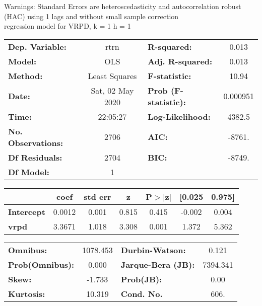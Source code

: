 Warnings: \newline
 [1] Standard Errors are heteroscedasticity and autocorrelation robust (HAC) using 1 lags and without small sample correction\\ 

regression model for VRPD, k = 1 h = 1\begin{center}
\begin{tabular}{lclc}
\toprule
\textbf{Dep. Variable:}    &       rtrn       & \textbf{  R-squared:         } &     0.013   \\
\textbf{Model:}            &       OLS        & \textbf{  Adj. R-squared:    } &     0.013   \\
\textbf{Method:}           &  Least Squares   & \textbf{  F-statistic:       } &     10.94   \\
\textbf{Date:}             & Sat, 02 May 2020 & \textbf{  Prob (F-statistic):} &  0.000951   \\
\textbf{Time:}             &     22:05:27     & \textbf{  Log-Likelihood:    } &    4382.5   \\
\textbf{No. Observations:} &        2706      & \textbf{  AIC:               } &    -8761.   \\
\textbf{Df Residuals:}     &        2704      & \textbf{  BIC:               } &    -8749.   \\
\textbf{Df Model:}         &           1      & \textbf{                     } &             \\
\bottomrule
\end{tabular}
\begin{tabular}{lcccccc}
                   & \textbf{coef} & \textbf{std err} & \textbf{z} & \textbf{P$> |$z$|$} & \textbf{[0.025} & \textbf{0.975]}  \\
\midrule
\textbf{Intercept} &       0.0012  &        0.001     &     0.815  &         0.415        &       -0.002    &        0.004     \\
\textbf{vrpd}      &       3.3671  &        1.018     &     3.308  &         0.001        &        1.372    &        5.362     \\
\bottomrule
\end{tabular}
\begin{tabular}{lclc}
\textbf{Omnibus:}       & 1078.453 & \textbf{  Durbin-Watson:     } &    0.121  \\
\textbf{Prob(Omnibus):} &   0.000  & \textbf{  Jarque-Bera (JB):  } & 7394.341  \\
\textbf{Skew:}          &  -1.733  & \textbf{  Prob(JB):          } &     0.00  \\
\textbf{Kurtosis:}      &  10.319  & \textbf{  Cond. No.          } &     606.  \\
\bottomrule
\end{tabular}
\end{center}

